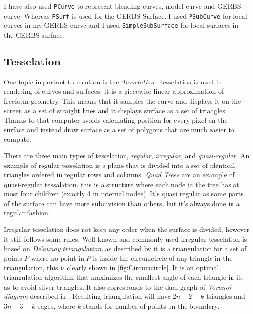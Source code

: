 \documentclass[a4paper,12pt]{extarticle}
\begin{document}
I have also used \verb|PCurve| to represent blending curves, model curve and GERBS curve. Whereas \verb|PSurf| is used for the GERBS Surface. I used \verb|PSubCurve| for local curves in my GERBS curve and I used \verb|SimpleSubSurface| for local surfaces in the GERBS surface.

\subsection{Tesselation}
One topic important to mention is the \emph{Tesselation}. Tesselation is used in rendering of curves and surfaces. It is a piecewise linear approximation of freeform geometry. This means that it samples the curve and displays it on the screen as a set of straight lines and it displays surface as a set of triangles. Thanks to that computer avoids calculating position for every pixel on the surface and instead draw surface as a set of polygons that are much easier to compute.

There are three main types of tesselation, \emph{regular}, \emph{irregular}, and \emph{quasi-regular}. An example of regular tesselation is a plane that is divided into a set of identical triangles ordered in regular rows and columns. \emph{Quad Trees} are an example of quasi-regular tessalation, this is a structure where each node in the tree has at most four children (exactly 4 in internal nodes). It's quasi regular as some parts of the surface can have more subdivision than others, but it's always done in a regular fashion.

Irregular tesselation does not keep any order when the surface is divided, however it still follows some rules. Well known and commonly used irregular tesselation is based on \emph{Delaunay triangulation}, as described by \citep[Chap 9.2]{Schwarzkopf1997} it is a triangulation for a set of points $P$ where no point in $P$ is inside the circumcircle of any triangle in the triangulation, this is clearly shown in \cref{fig:Circumcircle}. It is an optimal triangulation algorithm that maximizes the smallest angle of each triangle in it, as to avoid sliver triangles. It also corresponds to the dual graph of \emph{Voronoi diagram} described in \citep[Chap 7.1]{Schwarzkopf1997}. Resulting triangulation will have $2n-2-k$ triangles and $3n-3-k$ edges, where $k$ stands for number of points on the boundary.
\end{document}
